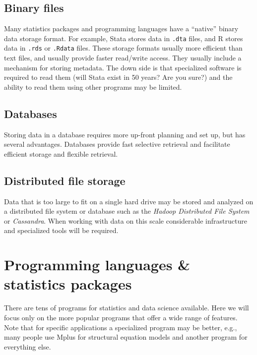 \documentclass[]{book}
\begin{document}
\hypertarget{binary-files}{%
\subsection{Binary files}\label{binary-files}}

Many statistics packages and programming languages have a ``native'' binary data storage format. For example, Stata stores data in \texttt{.dta} files, and R stores data in \texttt{.rds} or \texttt{.Rdata} files. These storage formats usually more efficient than text files, and usually provide faster read/write access. They usually include a mechanism for storing metadata. The down side is that specialized software is required to read them (will Stata exist in 50 years? Are you sure?) and the ability to read them using other programs may be limited.

\hypertarget{databases}{%
\subsection{Databases}\label{databases}}

Storing data in a database requires more up-front planning and set up, but has several advantages. Databases provide fast selective retrieval and facilitate efficient storage and flexible retrieval.

\hypertarget{distributed-file-storage}{%
\subsection{Distributed file storage}\label{distributed-file-storage}}

Data that is too large to fit on a single hard drive may be stored and analyzed on a distributed file system or database such as the \emph{Hadoop Distributed File System} or \emph{Cassandra}. When working with data on this scale considerable infrastructure and specialized tools will be required.

\hypertarget{programming-languages-statistics-packages}{%
\section{Programming languages \& statistics packages}\label{programming-languages-statistics-packages}}

There are tens of programs for statistics and data science available. Here we will focus only on the more popular programs that offer a wide range of features. Note that for specific applications a specialized program may be better, e.g., many people use Mplus for structural equation models and another program for everything else.
\end{document}
